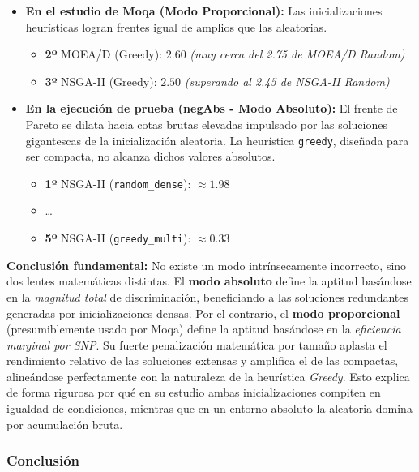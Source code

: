 \documentclass[a4paper,10pt]{article}
\begin{document}
\begin{itemize}
    \item \textbf{En el estudio de Moqa (Modo Proporcional):} Las inicializaciones heurísticas logran frentes igual de amplios que las aleatorias.
    \begin{itemize}
        \item \textbf{2º} MOEA/D (Greedy): $2.60$ \textit{(muy cerca del 2.75 de MOEA/D Random)}
        \item \textbf{3º} NSGA-II (Greedy): $2.50$ \textit{(superando al 2.45 de NSGA-II Random)}
    \end{itemize}

    \item \textbf{En la ejecución de prueba (negAbs - Modo Absoluto):} El frente de Pareto se dilata hacia cotas brutas elevadas impulsado por las soluciones gigantescas de la inicialización aleatoria. La heurística \texttt{greedy}, diseñada para ser compacta, no alcanza dichos valores absolutos.
    \begin{itemize}
        \item \textbf{1º} NSGA-II (\texttt{random\_dense}): $\approx \mathbf{1.98}$
        \item \dots
        \item \textbf{5º} NSGA-II (\texttt{greedy\_multi}): $\approx \mathbf{0.33}$
    \end{itemize}
\end{itemize}

\textbf{Conclusión fundamental:} No existe un modo intrínsecamente incorrecto, sino dos lentes matemáticas distintas. El \textbf{modo absoluto} define la aptitud basándose en la \textit{magnitud total} de discriminación, beneficiando a las soluciones redundantes generadas por inicializaciones densas. Por el contrario, el \textbf{modo proporcional} (presumiblemente usado por Moqa) define la aptitud basándose en la \textit{eficiencia marginal por SNP}. Su fuerte penalización matemática por tamaño aplasta el rendimiento relativo de las soluciones extensas y amplifica el de las compactas, alineándose perfectamente con la naturaleza de la heurística \textit{Greedy}. Esto explica de forma rigurosa por qué en su estudio ambas inicializaciones compiten en igualdad de condiciones, mientras que en un entorno absoluto la aleatoria domina por acumulación bruta.

\subsubsection{Conclusión}
\end{document}
